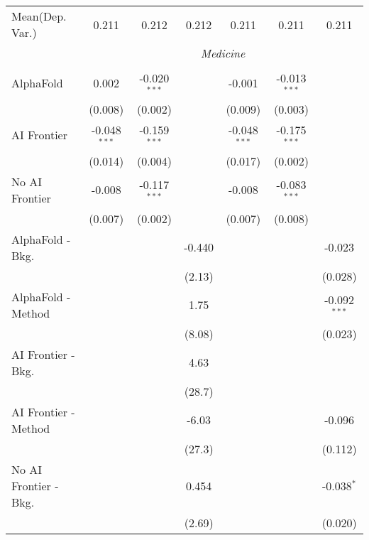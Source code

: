\begin{tabular}{lcccccc}
Mean(Dep. Var.) & 0.211 & 0.212 & 0.212 & 0.211 & 0.211 & 0.211 \\
 & \multicolumn{6}{c}{\textit{Medicine}} \\ \\
   AlphaFold               & 0.002          & -0.020$^{***}$ &        & -0.001         & -0.013$^{***}$ &   \\   
                           & (0.008)        & (0.002)        &        & (0.009)        & (0.003)        &   \\   
   AI Frontier             & -0.048$^{***}$ & -0.159$^{***}$ &        & -0.048$^{***}$ & -0.175$^{***}$ &   \\   
                           & (0.014)        & (0.004)        &        & (0.017)        & (0.002)        &   \\   
   No AI Frontier          & -0.008         & -0.117$^{***}$ &        & -0.008         & -0.083$^{***}$ &   \\   
                           & (0.007)        & (0.002)        &        & (0.007)        & (0.008)        &   \\   
   AlphaFold - Bkg.        &                &                & -0.440 &                &                & -0.023\\   
                           &                &                & (2.13) &                &                & (0.028)\\   
   AlphaFold - Method      &                &                & 1.75   &                &                & -0.092$^{***}$\\   
                           &                &                & (8.08) &                &                & (0.023)\\   
   AI Frontier - Bkg.      &                &                & 4.63   &                &                &   \\   
                           &                &                & (28.7) &                &                &   \\   
   AI Frontier - Method    &                &                & -6.03  &                &                & -0.096\\   
                           &                &                & (27.3) &                &                & (0.112)\\   
   No AI Frontier - Bkg.   &                &                & 0.454  &                &                & -0.038$^{*}$\\   
                           &                &                & (2.69) &                &                & (0.020)\\   

\end{tabular}
